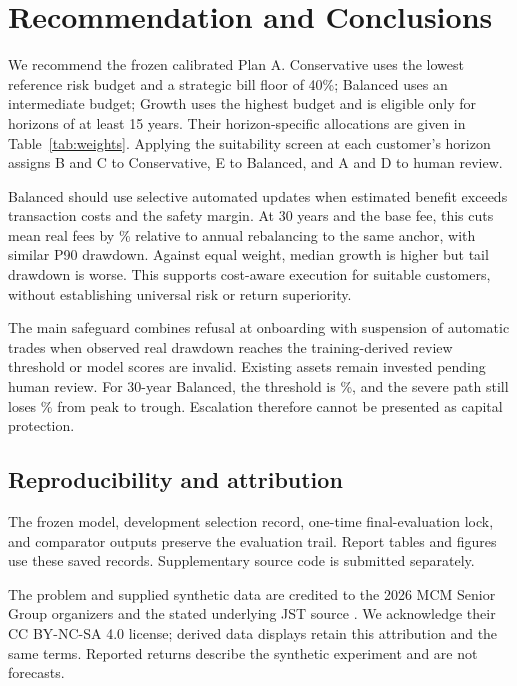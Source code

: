 \section{Recommendation and Conclusions}
We recommend the frozen calibrated Plan A. Conservative uses the lowest reference risk budget and a strategic bill floor of 40\%; Balanced uses an intermediate budget; Growth uses the highest budget and is eligible only for horizons of at least 15 years. Their horizon-specific allocations are given in Table~\ref{tab:weights}. Applying the suitability screen at each customer's horizon assigns B and C to Conservative, E to Balanced, and A and D to human review.

Balanced should use selective automated updates when estimated benefit exceeds transaction costs and the safety margin. At 30 years and the base fee, this cuts mean real fees by \CostSaving\% relative to annual rebalancing to the same anchor, with similar P90 drawdown. Against equal weight, median growth is higher but tail drawdown is worse. This supports cost-aware execution for suitable customers, without establishing universal risk or return superiority.

The main safeguard combines refusal at onboarding with suspension of automatic trades when observed real drawdown reaches the training-derived review threshold or model scores are invalid. Existing assets remain invested pending human review. For 30-year Balanced, the threshold is \ReviewThreshold\%, and the severe path still loses \SevereLoss\% from peak to trough. Escalation therefore cannot be presented as capital protection.

\subsection*{Reproducibility and attribution}
The frozen model, development selection record, one-time final-evaluation lock, and comparator outputs preserve the evaluation trail. Report tables and figures use these saved records. Supplementary source code is submitted separately.

The problem and supplied synthetic data are credited to the 2026 MCM Senior Group organizers and the stated underlying JST source \cite{problem,jst}. We acknowledge their CC BY-NC-SA 4.0 license; derived data displays retain this attribution and the same terms. Reported returns describe the synthetic experiment and are not forecasts.
